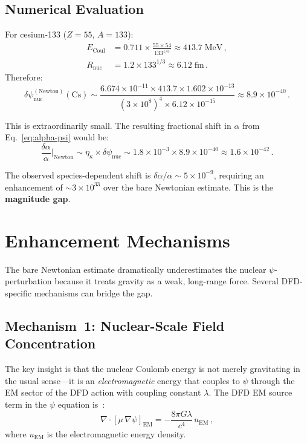 \documentclass[aps,prd,twocolumn,superscriptaddress,nofootinbib]{revtex4-2}
\newcommand{\ee}[1]{\times 10^{#1}}
\newcommand{\mufunction}{\mu}
\newcommand{\kap}{\kappa}
\newcommand{\lam}{\lambda}
\newcommand{\dpsi}{\delta\psi}
\newcommand{\dalpha}{\delta\alpha}
\begin{document}
\subsection{Numerical Evaluation}

For cesium-133 ($Z = 55$, $A = 133$):
\begin{align}
E_{\mathrm{Coul}} &= 0.711 \times \frac{55 \times 54}{133^{1/3}}
\approx 413.7\;\mathrm{MeV}\,,\\
R_{\mathrm{nuc}} &= 1.2 \times 133^{1/3} \approx 6.12\;\mathrm{fm}\,.
\end{align}
Therefore:
\begin{equation}
\dpsi_{\mathrm{nuc}}^{(\mathrm{Newton})}(\mathrm{Cs}) \sim
\frac{6.674\ee{-11} \times 413.7 \times 1.602\ee{-13}}
{(3\ee{8})^4 \times 6.12\ee{-15}}
\approx 8.9\ee{-40}\,.
\end{equation}

This is extraordinarily small.  The resulting fractional shift in
$\alpha$ from Eq.~\eqref{eq:alpha-psi} would be:
\begin{equation}
\frac{\dalpha}{\alpha}\bigg|_{\mathrm{Newton}} \sim
\eta_\kap \times \dpsi_{\mathrm{nuc}} \sim
1.8\ee{-3} \times 8.9\ee{-40} \approx 1.6\ee{-42}\,.
\end{equation}

The observed species-dependent shift is
$\dalpha/\alpha \sim 5\ee{-9}$, requiring an enhancement of
$\sim\!3\ee{33}$ over the bare Newtonian estimate.  This is the
\textbf{magnitude gap}.


\section{Enhancement Mechanisms}
\label{sec:enhancement}

The bare Newtonian estimate dramatically underestimates the nuclear
$\psi$-perturbation because it treats gravity as a weak,
long-range force.  Several DFD-specific mechanisms can bridge the gap.

\subsection{Mechanism~1: Nuclear-Scale Field Concentration}
\label{sec:concentration}

The key insight is that the nuclear Coulomb energy is not merely
gravitating in the usual sense---it is an \emph{electromagnetic}
energy that couples to $\psi$ through the EM sector of the DFD
action with coupling constant $\lam$.  The DFD EM source term
in the $\psi$ equation is~\cite{Alcock2026Core}:
\begin{equation}\label{eq:em-source}
\nabla\cdot[\mufunction\,\nabla\psi]_{\mathrm{EM}} =
-\frac{8\pi G\lam}{c^4}\,u_{\mathrm{EM}}\,,
\end{equation}
where $u_{\mathrm{EM}}$ is the electromagnetic energy density.
\end{document}
